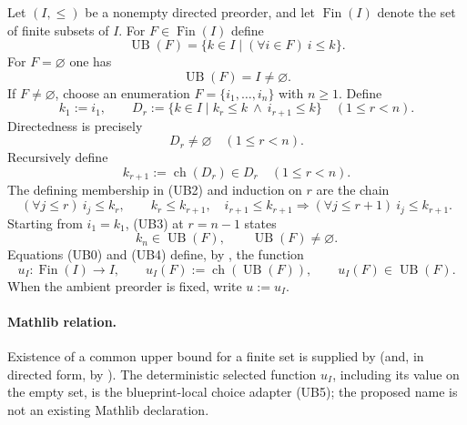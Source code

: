 \begin{definition}
  \label{def:nagata-directed-finite-upper-bound}

  Let $(I,\leq)$ be a nonempty directed preorder, and let
  $\operatorname{Fin}(I)$ denote the set of finite subsets of $I$.  For
  $F\in\operatorname{Fin}(I)$ define
  \[
    \operatorname{UB}(F)
      =\{k\in I\mid (\forall i\in F)\ i\leq k\}.
  \]
  For $F=\varnothing$ one has
  \[
    \operatorname{UB}(F)=I\neq\varnothing.                       \tag{UB0}
  \]
  If $F\neq\varnothing$, choose an enumeration
  $F=\{i_1,\ldots,i_n\}$ with $n\geq1$.  Define
  \[
    k_1:=i_1,\qquad
    D_r:=\{k\in I\mid k_r\leq k\ \wedge\ i_{r+1}\leq k\}
      \quad(1\leq r<n).                                          \tag{UB1}
  \]
  Directedness is precisely
  \[
    D_r\neq\varnothing\quad(1\leq r<n).
  \]
  Recursively define
  \[
    k_{r+1}:=\operatorname{ch}(D_r)\in D_r
      \quad(1\leq r<n).                                          \tag{UB2}
  \]
  The defining membership in (UB2) and induction on $r$ are the chain
  \[
    (\forall j\leq r)\ i_j\leq k_r,\qquad
    k_r\leq k_{r+1},\quad i_{r+1}\leq k_{r+1}
      \Longrightarrow
    (\forall j\leq r+1)\ i_j\leq k_{r+1}.                       \tag{UB3}
  \]
  Starting from $i_1=k_1$, (UB3) at $r=n-1$ states
  \[
    k_n\in\operatorname{UB}(F),\qquad
    \operatorname{UB}(F)\neq\varnothing.                        \tag{UB4}
  \]
  Equations (UB0) and (UB4) define, by
  , the function
  \[
    u_I\colon\operatorname{Fin}(I)\longrightarrow I,
    \qquad
    u_I(F):=\operatorname{ch}(\operatorname{UB}(F)),
    \qquad
    u_I(F)\in\operatorname{UB}(F).                               \tag{UB5}
  \]
  When the ambient preorder is fixed, write $u:=u_I$.

  \paragraph{Mathlib relation.}
  Existence of a common upper bound for a finite set is supplied by
  \texttt{} (and, in directed form, by
  \texttt{}).  The deterministic selected
  function $u_I$, including its value on the empty set, is the
  blueprint-local choice adapter (UB5); the proposed name
  \texttt{} is not an existing
  Mathlib declaration.
\end{definition}

